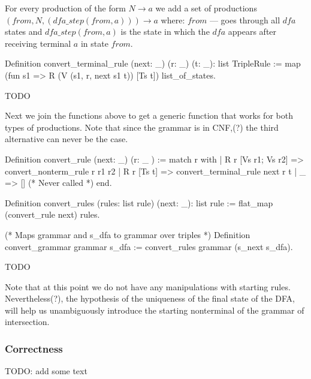 For every production of the form $N \to a$ we add a set of productions $(from, N, (dfa\_step(from, a))) \to a$ where: $from$ --- goes through all $dfa$ states and $dfa\_step (from, a)$ is the state in which the $dfa$ appears after receiving terminal $a$ in state $from$.

\begin{listing}[h]
    \begin{pyglist}[language=coq, numbers=none, numbersep=5pt]
  Definition convert_terminal_rule 
              (next: _) 
              (r: _) 
              (t: _): list TripleRule :=
    map (fun s1 => R (V (s1, r, next s1 t)) [Ts t]) 
        list_of_states.
    \end{pyglist}
    \caption{TODO}
    \label{lst:verbments1}
\end{listing}

Next we join the functions above to get a generic function that works for both types of productions. Note that since the grammar is in CNF,(?) the third alternative can never be the case.

\begin{listing}[h]
    \begin{pyglist}[language=coq, numbers=none, numbersep=5pt]
  Definition convert_rule (next: _) (r: _ ) :=
    match r with
    | R r [Vs r1; Vs r2] => 
        convert_nonterm_rule r r1 r2
    | R r [Ts t] => 
        convert_terminal_rule next r t 
    | _  => []   (* Never called *)
    end.
        
  Definition convert_rules 
    (rules: list rule) (next: _): list rule :=
    flat_map (convert_rule next) rules.
    
  (* Maps grammar and s_dfa to grammar over triples *)
  Definition convert_grammar grammar s_dfa :=
    convert_rules grammar (s_next s_dfa). 
    \end{pyglist}
    \caption{TODO}
    \label{lst:verbments1}
\end{listing}

Note that at this point we do not have any manipulations with starting rules. Nevertheless(?), the hypothesis of the uniqueness of the final state of the DFA, will help us unambiguously introduce the starting nonterminal of the grammar of intersection.

\subsubsection{Correctness}

TODO: add some text 

